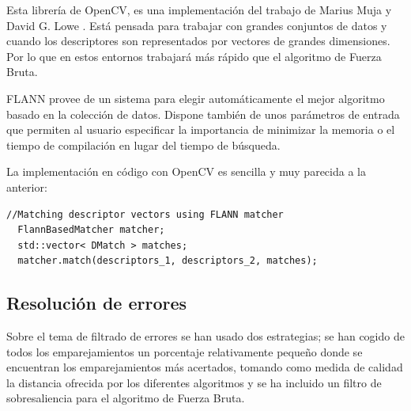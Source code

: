 Esta librería de OpenCV, es una implementación del trabajo de Marius Muja y David G. Lowe \parencite{Reference11}. Está pensada para trabajar con grandes conjuntos de datos y cuando los descriptores son representados por vectores de grandes dimensiones. Por lo que en estos entornos trabajará más rápido que el algoritmo de Fuerza Bruta.

FLANN provee de un sistema para elegir automáticamente el mejor algoritmo basado en la colección de datos. Dispone también de unos parámetros de entrada que permiten al usuario especificar la importancia de minimizar la memoria o el tiempo de compilación en lugar del tiempo de búsqueda.

La implementación en código con OpenCV es sencilla y muy parecida a la anterior:

\begin{lstlisting}[style=CStyle]
  //Matching descriptor vectors using FLANN matcher
  FlannBasedMatcher matcher;
  std::vector< DMatch > matches;
  matcher.match(descriptors_1, descriptors_2, matches);
\end{lstlisting}
\subsection{Resolución de errores}

Sobre el tema de filtrado de errores se han usado dos estrategias; se han cogido de todos los emparejamientos un porcentaje relativamente pequeño donde se encuentran los emparejamientos más acertados, tomando como medida de calidad la distancia ofrecida por los diferentes algoritmos y se ha incluido un filtro de sobresaliencia para el algoritmo de Fuerza Bruta.




